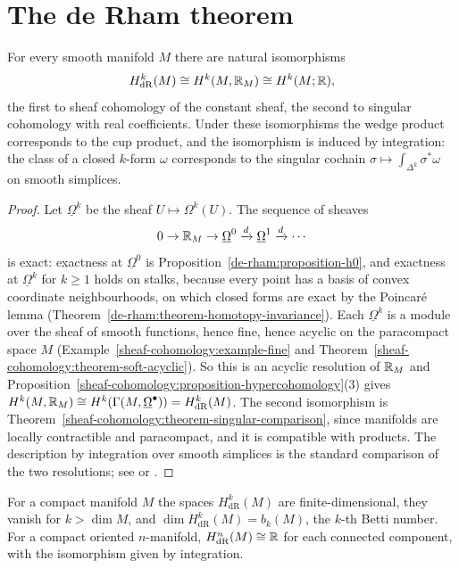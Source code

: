 \section{The de Rham theorem}\label{de-rham:section-de-rham-theorem}

\begin{theorem}[de Rham]\label{de-rham:theorem-de-rham}
For every smooth manifold $M$ there are natural isomorphisms
\[
H^k_{\mathrm{dR}}(M) \cong H^k(M, \mathbb{R}_M) \cong H^k(M; \mathbb{R}),
\]
the first to sheaf cohomology of the constant sheaf, the second to singular cohomology with real coefficients. Under these isomorphisms the wedge product corresponds to the cup product, and the
isomorphism is induced by integration: the class of a closed $k$-form $\omega$ corresponds to the singular cochain $\sigma \mapsto \int_{\Delta^k}\sigma^*\omega$ on smooth simplices.
\end{theorem}

\begin{proof}
Let $\underline{\Omega}^k$ be the sheaf $U \mapsto \Omega^k(U)$. The sequence of sheaves
\[
0 \to \mathbb{R}_M \to \underline{\Omega}^0 \xrightarrow{d} \underline{\Omega}^1 \xrightarrow{d} \cdots
\]
is exact: exactness at $\underline{\Omega}^0$ is Proposition~\ref{de-rham:proposition-h0}, and exactness at $\underline{\Omega}^k$ for $k \geq 1$ holds on stalks, because every point has a basis of convex
coordinate neighbourhoods, on which closed forms are exact by the Poincar\'e lemma (Theorem~\ref{de-rham:theorem-homotopy-invariance}). Each $\underline{\Omega}^k$ is a module over the sheaf of smooth
functions, hence fine, hence acyclic on the paracompact space $M$ (Example~\ref{sheaf-cohomology:example-fine} and
Theorem~\ref{sheaf-cohomology:theorem-soft-acyclic}). So this is an acyclic resolution of $\mathbb{R}_M$ and
Proposition~\ref{sheaf-cohomology:proposition-hypercohomology}(3) gives $H^k(M, \mathbb{R}_M) \cong H^k(\Gamma(M, \underline{\Omega}^\bullet)) = H^k_{\mathrm{dR}}(M)$. The second isomorphism is
Theorem~\ref{sheaf-cohomology:theorem-singular-comparison}, since manifolds are locally contractible and paracompact, and it is compatible with products. The description by integration over smooth simplices
is the standard comparison of the two resolutions; see \cite[Chapter 5]{warner-foundations} or \cite[Chapter III]{bredon-sheaf}.
\end{proof}

\begin{corollary}\label{de-rham:corollary-consequences}
For a compact manifold $M$ the spaces $H^k_{\mathrm{dR}}(M)$ are finite-dimensional, they vanish for $k > \dim M$, and $\dim H^k_{\mathrm{dR}}(M) = b_k(M)$, the $k$-th Betti number. For a compact oriented
$n$-manifold, $H^n_{\mathrm{dR}}(M) \cong \mathbb{R}$ for each connected component, with the isomorphism given by integration.
\end{corollary}

